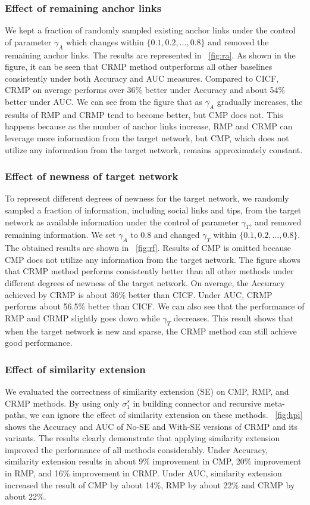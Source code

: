 \documentclass[conference]{IEEEtran}
\begin{document}
\subsubsection{Effect of remaining anchor links}
We kept a fraction of randomly sampled existing anchor links under the control of parameter $\gamma_A$ which changes within $\{0.1,0.2,\dots,0.8\}$ and removed the remaining anchor links. The results are represented in \figurename~\ref{fig:ra}. As shown in the figure, it can be seen that CRMP method outperforms all other baselines consistently under both Accuracy and AUC measures. Compared to CICF, CRMP on average performs over 36\% better under Accuracy and about 54\% better under AUC. We can see from the figure that as $\gamma_A$ gradually increases, the results of RMP and CRMP tend to become better, but CMP does not. This happens because as the number of anchor links increase, RMP and CRMP can leverage more information from the target network, but CMP, which does not utilize any information from the target network, remains approximately constant.

\subsubsection{Effect of newness of target network}
To represent different degrees of newness for the target network, we randomly sampled a fraction of information, including social links and tips, from the target network as available information under the control of parameter $\gamma_T$, and removed remaining information. We set $\gamma_A$ to 0.8 and changed $\gamma_T$ within $\{0.1,0.2,\dots,0.8\}$. The obtained results are shown in \figurename~\ref{fig:rf}. Results of CMP is omitted because CMP does not utilize any information from the target network. The figure shows that CRMP method performs consistently better than all other methods under different degrees of newness of the target network. On average, the Accuracy achieved by CRMP is about 36\% better than CICF. Under AUC, CRMP performs about 56.5\% better than CICF. We can also see that the performance of RMP and CRMP slightly goes down while $\gamma_T$ decreases. This result shows that when the target network is new and sparse, the CRMP method can still achieve good performance.

\subsubsection{Effect of similarity extension}
We evaluated the correctness of similarity extension (SE) on CMP, RMP, and CRMP methods. By using only $\sigma_1^s$ in building connector and recursive meta-paths, we can ignore the effect of similarity extension on these methods. \figurename~\ref{fig:hpi} shows the Accuracy and AUC of No-SE and With-SE versions of CRMP and its variants. The results clearly demonstrate that applying similarity extension improved the performance of all methods considerably. Under Accuracy, similarity extension results in about 9\% improvement in CMP, 20\% improvement in RMP, and 16\% improvement in CRMP. Under AUC, similarity extension increased the result of CMP by about 14\%, RMP by about 22\% and CRMP by about 22\%. 
\end{document}
